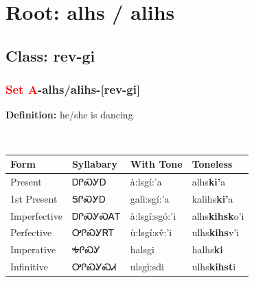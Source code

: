 \needspace{4in}
\section*{Root: alhs / alihs}
\nopagebreak
{}
\needspace{3in}
\subsection*{Class: rev-gi}
\nopagebreak
\needspace{2in}
\subsubsection*{\textcolor{Red}{Set A}{-}\textbf{alhs/alihs}{-}[rev-gi]}
\nopagebreak
\textbf{Definition: } he/she is dancing
\\[0.5em]
\begin{tabularx}{\textwidth}{l X X X}%
\toprule%
\textbf{Form}&\textbf{Syllabary}&\textbf{With Tone}&\textbf{Toneless}\\%
\midrule%
Present&ᎠᎵᏍᎩᎠ&à:lsgí:’a&alhs\textbf{ki'}a\\%
1st Present&ᎦᎵᏍᎩᎠ&galì:sgí:’a&kalihs\textbf{ki'}a\\%
Imperfective&ᎠᎵᏍᎩᏍᎪᎢ&à:lsgí:sgó:’i&alhs\textbf{kihsk}o'i\\%
Perfective&ᎤᎵᏍᎩᏒᎢ&ù:lsgí:sv̌:’i&ulhs\textbf{kihs}v'i\\%
Imperative&ᎭᎵᏍᎩ&halsgi&halhs\textbf{ki}\\%
Infinitive&ᎤᎵᏍᎩᏍᏗ&ulsgì:sdi&ulhs\textbf{kihst}i\\%
\bottomrule%
\end{tabularx}
\\[1em]